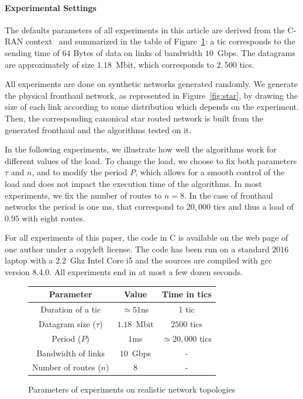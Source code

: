 \documentclass[a4paper,10pt]{journal}
\begin{document}
   \paragraph{Experimental Settings}


     The defaults parameters of all experiments in this article are derived from the C-RAN context~\cite{wang2017cloud} and summarized in the table of Figure~\ref{tab:params}: a tic corresponds to the sending time of $64$ Bytes of data on links of bandwidth $10$~Gbps. The datagrams are approximately of size $1.18$~Mbit, which corresponds to $2,500$ tics. 

     All experiments are done on synthetic networks generated randomly. We generate the physical fronthaul
     network, as represented in Figure~\ref{fig:star}, by drawing the size of each link according to some distribution which depends on the experiment. Then, the corresponding canonical star routed network is built from the generated fronthaul and the algorithms tested on it. 

     In the following experiments, we illustrate how well the algorithms work for different values of the load. To change the load, we choose to fix both parameters $\tau$ and $n$, and to modify the period $P$, which allows for a smooth control of the load and does not impact the execution time of the algorithms. In most experiments, we fix the number of routes to $n = 8$. In the case of fronthaul networks the period is one ms, that correspond to $20,000$ tics and thus a load of $0.95$ with eight routes.

     For all experiments of this paper, the code in C is available on the web page of one author\cite{webpage} under a copyleft license. The code has been run on a standard $2016$ laptop with a $2.2$~Ghz Intel Core i5 and the sources are compiled with gcc version 8.4.0. All experiments end in at most a few dozen seconds.

\begin{figure}
\begin{center}
\begin{tabular}{|c|c|c|}
\hline
Parameter& Value & Time in tics \\
\hline
Duration of a tic& $\simeq51$ns&1 tic\\
\hline
Datagram size ($\tau$)&  $1.18$~Mbit & $2500$ tics\\
\hline
Period ($P$)& $1$ms&$\simeq20,000$ tics\\
\hline
Bandwidth of links &  $10$~Gbps & -\\
\hline
Number of routes ($n$) & $8$ & -\\
\hline
\end{tabular}

\end{center}

\caption{Parameters of experiments on realistic network topologies}
\label{tab:params}
\end{figure}
\end{document}
